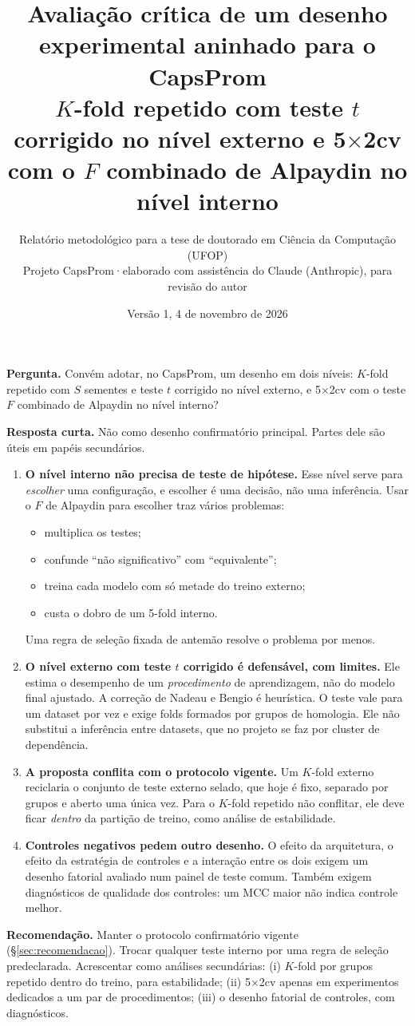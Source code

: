 \documentclass[11pt,a4paper]{article}
\title{\sffamily\bfseries Avaliação crítica de um desenho experimental aninhado para o CapsProm\\[4pt]
\large\mdseries $K$-fold repetido com teste $t$ corrigido no nível externo e 5$\times$2cv com o $F$ combinado de Alpaydin no nível interno}
\author{\sffamily Relatório metodológico para a tese de doutorado em Ciência da Computação (UFOP)\\
\sffamily\small Projeto CapsProm\quad·\quad elaborado com assistência do Claude (Anthropic), para revisão do autor}
\date{\sffamily\small Versão 1, 4 de novembro de 2026}
\begin{document}
\maketitle
\thispagestyle{fancy}

\begin{resumo}
\textbf{Pergunta.} Convém adotar, no CapsProm, um desenho em dois níveis: $K$-fold repetido com $S$ sementes e teste $t$ corrigido no nível externo, e 5$\times$2cv com o teste $F$ combinado de Alpaydin no nível interno?

\textbf{Resposta curta.} Não como desenho confirmatório principal. Partes dele são úteis em papéis secundários.
\begin{enumerate}[leftmargin=1.4em]
\item \textbf{O nível interno não precisa de teste de hipótese.} Esse nível serve para \emph{escolher} uma configuração, e escolher é uma decisão, não uma inferência. Usar o $F$ de Alpaydin para escolher traz vários problemas:
  \begin{itemize}[leftmargin=1.2em]
  \item multiplica os testes;
  \item confunde ``não significativo'' com ``equivalente'';
  \item treina cada modelo com só metade do treino externo;
  \item custa o dobro de um 5-fold interno.
  \end{itemize}
  Uma regra de seleção fixada de antemão resolve o problema por menos.
\item \textbf{O nível externo com teste $t$ corrigido é defensável, com limites.} Ele estima o desempenho de um \emph{procedimento} de aprendizagem, não do modelo final ajustado. A correção de Nadeau e Bengio é heurística. O teste vale para um dataset por vez e exige folds formados por grupos de homologia. Ele não substitui a inferência entre datasets, que no projeto se faz por cluster de dependência.
\item \textbf{A proposta conflita com o protocolo vigente.} Um $K$-fold externo reciclaria o conjunto de teste externo selado, que hoje é fixo, separado por grupos e aberto uma única vez. Para o $K$-fold repetido não conflitar, ele deve ficar \emph{dentro} da partição de treino, como análise de estabilidade.
\item \textbf{Controles negativos pedem outro desenho.} O efeito da arquitetura, o efeito da estratégia de controles e a interação entre os dois exigem um desenho fatorial avaliado num painel de teste comum. Também exigem diagnósticos de qualidade dos controles: um MCC maior não indica controle melhor.
\end{enumerate}
\textbf{Recomendação.} Manter o protocolo confirmatório vigente (\S\ref{sec:recomendacao}). Trocar qualquer teste interno por uma regra de seleção predeclarada. Acrescentar como análises secundárias: (i) $K$-fold por grupos repetido dentro do treino, para estabilidade; (ii) 5$\times$2cv apenas em experimentos dedicados a um par de procedimentos; (iii) o desenho fatorial de controles, com diagnósticos.
\end{resumo}
\end{document}
